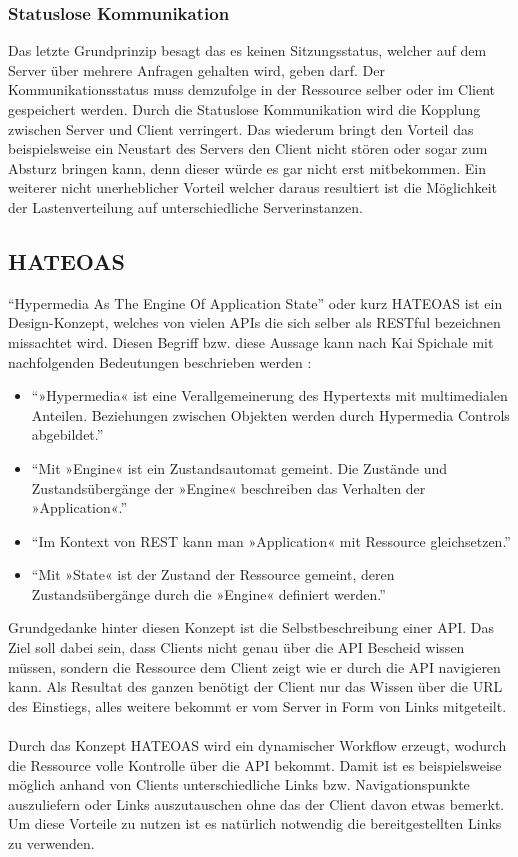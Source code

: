 \subsubsection{Statuslose Kommunikation}
Das letzte Grundprinzip besagt das es keinen Sitzungsstatus, welcher auf dem Server über mehrere Anfragen gehalten wird, geben darf. Der Kommunikationsstatus muss demzufolge in der Ressource selber oder im Client gespeichert werden. Durch die Statuslose Kommunikation wird die Kopplung zwischen Server und Client verringert. Das wiederum bringt den Vorteil das beispielsweise ein Neustart des Servers den Client nicht stören oder sogar zum Absturz bringen kann, denn dieser würde es gar nicht erst mitbekommen. Ein weiterer nicht unerheblicher Vorteil welcher daraus resultiert ist die Möglichkeit der Lastenverteilung auf unterschiedliche Serverinstanzen.

\subsection{HATEOAS}
\enquote{Hypermedia As The Engine Of Application State} oder kurz HATEOAS ist ein Design-Konzept, welches von vielen \glspl{API} die sich selber als \gls{REST}ful bezeichnen missachtet wird. Diesen Begriff bzw. diese Aussage kann nach Kai Spichale mit nachfolgenden Bedeutungen beschrieben werden \cite[156]{apiDesign}:
\begin{itemize}
	\item \enquote{»Hypermedia« ist eine Verallgemeinerung des Hypertexts mit multimedialen Anteilen. Beziehungen zwischen Objekten werden durch
		Hypermedia Controls abgebildet.}
	\item \enquote{Mit »Engine« ist ein Zustandsautomat gemeint. Die Zustände und
		Zustandsübergänge der »Engine« beschreiben das Verhalten der
		»Application«.}
	\item \enquote{Im Kontext von REST kann man »Application« mit Ressource
		gleichsetzen.}
	\item \enquote{Mit »State« ist der Zustand der Ressource gemeint, deren Zustandsübergänge durch die »Engine« definiert werden.}
\end{itemize}
Grundgedanke hinter diesen Konzept ist die Selbstbeschreibung einer \gls{API}. Das Ziel soll dabei sein, dass Clients nicht genau über die \gls{API} Bescheid wissen müssen, sondern die Ressource dem Client zeigt wie er durch die \gls{API} navigieren kann. Als Resultat des ganzen benötigt der Client nur das Wissen über die \gls{URL} des Einstiegs, alles weitere bekommt er vom Server in Form von Links mitgeteilt. \\
\\
Durch das Konzept HATEOAS wird ein dynamischer Workflow erzeugt, wodurch die Ressource volle Kontrolle über die \gls{API} bekommt. Damit ist es beispielsweise möglich anhand von Clients unterschiedliche Links bzw. Navigationspunkte auszuliefern oder Links auszutauschen ohne das der Client davon etwas bemerkt. Um diese Vorteile zu nutzen ist es natürlich notwendig die bereitgestellten Links zu verwenden.


